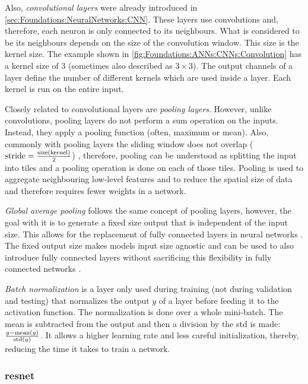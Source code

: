 Also, \emph{convolutional layers} were already introduced in \autoref{sec:Foundations:NeuralNetworks:CNN}. These layers use convolutions and, therefore, each neuron is only connected to its neighbours. What is considered to be its neighbours depends on the size of the convolution window. This size is the kernel size. The example shown in \autoref{fig:Foundations:ANNs:CNNs:Convolution} has a kernel size of 3 (sometimes also described as $3 \times 3$). The output channels of a layer define the number of different kernels which are used inside a layer. Each kernel is run on the entire input.

Closely related to convolutional layers are \emph{pooling layers}. However, unlike convolutions, pooling layers do not perform a sum operation on the inputs. Instead, they apply a pooling function (often, maximum or mean). Also, commonly with pooling layers the sliding window does not overlap ($\mathrm{stride} = \frac{\mathrm{size}(\mathrm{kernel})}{2}$) \cite{scherer2010evaluation}, therefore, pooling can be understood as splitting the input into tiles and a pooling operation is done on each of those tiles. Pooling is used to aggregate neighbouring low-level features and to reduce the spatial size of data and therefore requires fewer weights in a network.

\emph{Global average pooling} follows the same concept of pooling layers, however, the goal with it is to generate a fixed size output that is independent of the input size. This allows for the replacement of fully connected layers in neural networks \cite{lin2014network}. The fixed output size makes models input size agnostic and can be used to also introduce fully connected layers without sacrificing this flexibility in fully connected networks \cite{he2016deep}.

\emph{Batch normalization} \cite{ioffe2015batch} is a layer only used during training (not during validation and testing) that normalizes the output $y$ of a layer before feeding it to the activation function. The normalization is done over a whole mini-batch. The mean is subtracted from the output and then a division by the \acf{std} is made: $\frac{y - \mathrm{mean}(y)}{\mathrm{std} (y)}$. It allows a higher learning rate and less careful initialization, thereby, reducing the time it takes to train a network.


\subsubsection{\acs{resnet}}
\label{sec:Foundations:NeuralNetworks:Architecture:ResNet}


